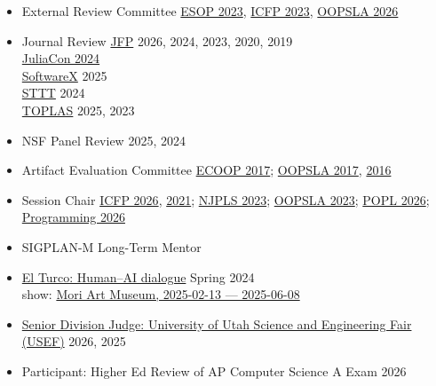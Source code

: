 \documentclass[11pt]{article}
\begin{document}
\begin{itemize}
  \item {External Review Committee} \hfill \href{https://etaps.org/2023/esop}{ESOP 2023},
                                           \href{https://icfp23.sigplan.org/}{ICFP 2023},
                                           \href{https://2026.splashcon.org/track/oopsla-2026}{OOPSLA 2026}
  \item {Journal Review}
           \hfill \href{https://www.cambridge.org/core/journals/journal-of-functional-programming}{JFP} 2026, 2024, 2023, 2020, 2019 \\ %
    \hbox{}\hfill \href{https://juliacon.org/2024/}{JuliaCon 2024} \\
    \hbox{}\hfill \href{https://www.sciencedirect.com/journal/softwarex}{SoftwareX} 2025 \\
    \hbox{}\hfill \href{https://link.springer.com/journal/10009}{STTT} 2024 \\
    \hbox{}\hfill \href{https://dl.acm.org/journal/toplas}{TOPLAS} 2025, %
                                                                   2023 %
  \item {NSF Panel Review} \hfill {2025, 2024}
  \item {Artifact Evaluation Committee} \hfill \href{https://2017.ecoop.org/track/ecoop-2017-Artifacts}{ECOOP 2017};
                                               \href{https://2017.splashcon.org/track/splash-2017-OOPSLA-Artifacts}{OOPSLA 2017},
                                               \href{http://2016.splashcon.org/track/splash-2016-artifacts}{2016}
  \item {Session Chair} \hfill \href{https://icfp26.sigplan.org/committee/icfp-2026-icfp-papers-program-committee}{ICFP 2026}, \href{https://icfp21.sigplan.org/program/program-icfp-2021/}{2021};
                               \href{https://www.njpls.org/nov2023.html}{NJPLS 2023};
                               \href{https://2023.splashcon.org/program/program-splash-2023/?date=Wed%2025%20Oct%202023&room=Room%20II}{OOPSLA 2023};
                               \href{https://popl26.sigplan.org/program/program-POPL-2026/}{POPL 2026};
                               \href{https://2026.programming-conference.org/program/program-programming-2026}{Programming 2026}
  \item {SIGPLAN-M Long-Term Mentor} \hfill {} %
  \item \href{https://elturco.diemutstrebe.com}{El Turco: Human--AI dialogue} \hfill Spring 2024 \\
    show: \href{https://www.shift.jp.org/en/archives/2025/02/machine-love-video-game-ai-and-contemporary-art.html/3/}{Mori Art Museum, 2025-02-13 --- 2025-06-08}
  \item \href{https://usef.utah.edu/fair-details}{Senior Division Judge: University of Utah Science and Engineering Fair (USEF)} \hfill 2026, 2025
  \item {Participant: Higher Ed Review of AP Computer Science A Exam} \hfill 2026


\end{itemize}
\end{document}
